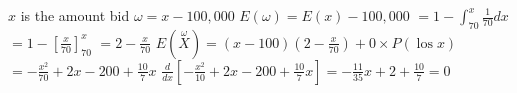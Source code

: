 $x$ is the amount bid
$\omega=x-100,000$
$E(\omega)=E(x)-100,000$
$=1-\int_{70}^{x} \frac{1}{70} d x$
$=1-\left[\frac{x}{70}\right]_{70}^{x}$
$=2-\frac{x}{70}$
$E(\stackrel{\omega}{X})=(x-100)\left(2-\frac{x}{70}\right)+0 \times P(\operatorname{los} x)$
$=-\frac{x^{2}}{70}+2 x-200+\frac{10}{7} x$
$\frac{d}{d x}\left[-\frac{x^{2}}{10}+2 x-200+\frac{10}{7} x\right]=-\frac{11}{35} x+2+\frac{10}{7}=0$